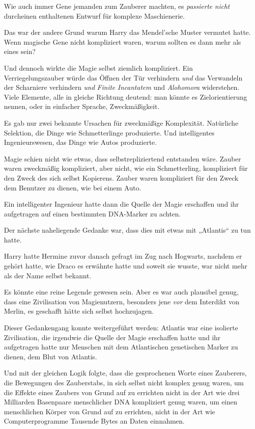 {Wie auch immer Gene jemanden zum Zauberer machten, es \emph{passierte nicht} durcheinen enthaltenen Entwurf für komplexe Maschienerie.

Das war der andere Grund warum Harry das Mendel'sche Muster vermutet hatte. Wenn magische Gene nicht kompliziert waren, warum sollten es dann mehr als eines sein?

Und dennoch wirkte die Magie selbst ziemlich kompliziert. Ein Verriegelungszauber würde das Öffnen der Tür verhindern \emph{und} das Verwandeln der Scharniere verhindern \emph{und} \emph{Finite Incantatem} und \emph{Alohomora} widerstehen. Viele Elemente, alle in gleiche Richtung deutend: man könnte es Zielorientierung nennen, oder in einfacher Sprache, Zweckmäßigkeit.

Es gab nur zwei bekannte Ursachen für zweckmäßige Komplexität. Natürliche Selektion, die Dinge wie Schmetterlinge produzierte. Und intelligentes Ingenieurswesen, das Dinge wie Autos produzierte.

Magie schien nicht wie etwas, dass selbstrepliziertend entstanden wäre. Zauber waren zweckmäßig kompliziert, aber nicht, wie ein Schmetterling, kompliziert für den Zweck des sich selbst Kopierens. Zauber waren kompliziert für den Zweck dem Benutzer zu dienen, wie bei einem Auto.

Ein intelligenter Ingenieur hatte dann die Quelle der Magie erschaffen und ihr aufgetragen auf einen bestimmten DNA-Marker zu achten.

Der nächste naheliegende Gedanke war, dass dies mit etwas mit „Atlantis“ zu tun hatte.

Harry hatte Hermine zuvor danach gefragt \later im Zug nach Hogwarts, nachdem er gehört hatte, wie Draco es erwähnte hatte \later und soweit sie wusste, war nicht mehr als der Name selbst bekannt.

Es könnte eine reine Legende gewesen sein. Aber es war auch plausibel genug, dass eine Zivilisation von Magienutzern, besonders jene \emph{vor} dem Interdikt von Merlin, es geschafft hätte sich selbst hochzujagen.

Dieser Gedankengang konnte weitergeführt werden: Atlantis war eine isolierte Zivilisation, die irgendwie die Quelle der Magie erschaffen hatte und ihr aufgetragen hatte nur Menschen mit dem Atlantischen genetischen Marker zu dienen, dem Blut von Atlantis.

Und mit der gleichen Logik folgte, dass die gesprochenen Worte eines Zauberers, die Bewegungen des Zauberstabs, in sich selbst nicht komplex genug waren, um die Effekte eines Zaubers von Grund auf zu errichten \later nicht in der Art wie drei Milliarden Basenpaare menschlicher DNA kompliziert genug waren, um einen menschlichen Körper von Grund auf zu errichten, nicht in der Art wie Computerprogramme Tausende Bytes an Daten einnahmen.

}
